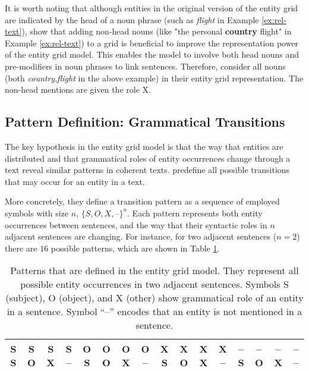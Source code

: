 It is worth noting that although entities in the original version of the entity grid are indicated by the head of a noun phrase (such as \emph{flight} in Example \ref{ex:rel-text}),  show that adding non-head nouns (like "the personal \textbf{country} flight" in Example \ref{ex:rel-text}) to a grid is beneficial to improve the representation power of the entity grid model. 
This enables the model to involve both head nouns and pre-modifiers in noun phrases to link sentences. 
Therefore,  consider all nouns (both \emph{country},\emph{flight} in the above example) in their entity grid representation.  
The non-head mentions are given the role X. 

\subsection{Pattern Definition: Grammatical Transitions}
%
The key hypothesis in the entity grid model is that the way that entities are distributed and that grammatical roles of entity occurrences change through a text reveal similar patterns in coherent texts.  
 predefine all possible transitions that may occur for an entity in a text. 

More concretely, they define a transition pattern as a sequence of employed symbols with size $n$, $\{ S,O,X,\textit{--} \}^n$. 
Each pattern represents both entity occurrences between sentences, and the way that their syntactic roles in $n$ adjacent sentences are changing. 
For instance, for two adjacent sentences ($n=2$) there are $16$ possible patterns, which are shown in Table \ref{table:rel-egrid-pattern}.

\begin{table}[!ht]
	\begin{center}
		\resizebox{\columnwidth}{!}
		{%
			\begin{tabular}{@{}cccccccccccccccc@{}}
			\hline
			S S & S O & S X & S -- & 
			O S & O O & O X & O -- & 
			X S & X O & X X & X -- & 
			-- S & -- O & -- X & -- -- 
			\\\hline
			\end{tabular}
		}%
	\end{center}
	\caption{Patterns that are defined in the entity grid model.  
	They represent all possible entity occurrences in two adjacent sentences. 
	Symbols S (subject), O (object), and X (other) show grammatical role of an entity in a sentence. Symbol ``--'' encodes that an entity is not mentioned in a sentence.}
	\label{table:rel-egrid-pattern}
\end{table}

